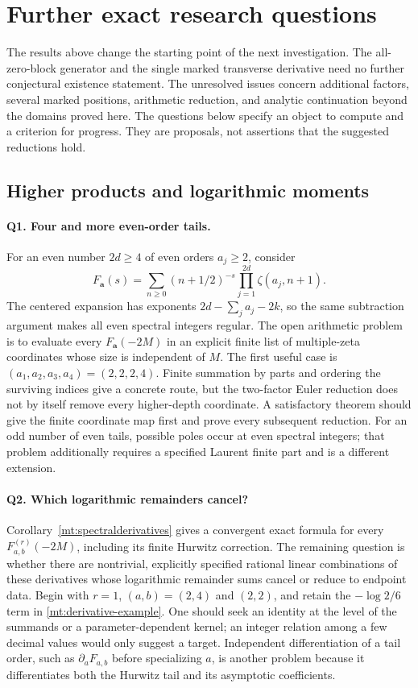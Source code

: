 \section{Further exact research questions}
\label{research:section}

The results above change the starting point of the next investigation.
The all-zero-block generator and the single marked transverse derivative
need no further conjectural existence statement. The unresolved issues
concern additional factors, several marked positions, arithmetic
reduction, and analytic continuation beyond the domains proved here.
The questions below specify an object to compute and a criterion for
progress. They are proposals, not assertions that the suggested
reductions hold.

\subsection{Higher products and logarithmic moments}

\paragraph{Q1. Four and more even-order tails.}
For an even number $2d\geq4$ of even orders $a_j\geq2$, consider
\[
 F_{\boldsymbol a}(s)=\sum_{n\geq0}(n+1/2)^{-s}
                         \prod_{j=1}^{2d}\zeta(a_j,n+1).
\]
The centered expansion has exponents
$2d-\sum_j a_j-2k$, so the same subtraction argument makes all even
spectral integers regular. The open arithmetic problem is to evaluate
every $F_{\boldsymbol a}(-2M)$ in an explicit finite list of
multiple-zeta coordinates whose size is independent of $M$.
The first useful case is $(a_1,a_2,a_3,a_4)=(2,2,2,4)$.
Finite summation by parts and ordering the surviving indices give a
concrete route, but the two-factor Euler reduction does not by itself
remove every higher-depth coordinate. A satisfactory theorem should
give the finite coordinate map first and prove every subsequent
reduction. For an odd number of even tails, possible poles occur at
even spectral integers; that problem additionally requires a specified
Laurent finite part and is a different extension.

\paragraph{Q2. Which logarithmic remainders cancel?}
Corollary~\ref{mt:spectralderivatives} gives a convergent exact formula
for every $F_{a,b}^{(r)}(-2M)$, including its finite Hurwitz correction.
The remaining question is whether there are nontrivial, explicitly
specified rational linear combinations of these derivatives whose
logarithmic remainder sums cancel or reduce to endpoint data.
Begin with $r=1$, $(a,b)=(2,4)$ and $(2,2)$, and retain the
$-\log2/6$ term in \eqref{mt:derivative-example}.
One should seek an identity at the level of the summands or a
parameter-dependent kernel; an integer relation among a few decimal
values would only suggest a target. Independent differentiation of a
tail order, such as $\partial_a F_{a,b}$ before specializing $a$,
is another problem because it differentiates both the Hurwitz tail and
its asymptotic coefficients.

